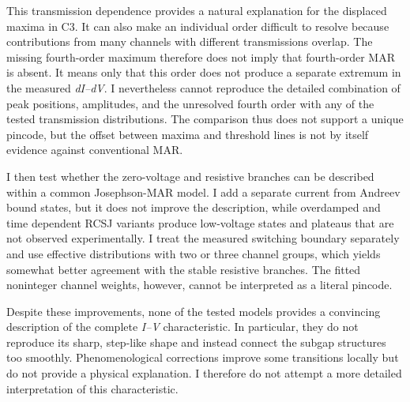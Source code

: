         This transmission dependence provides a natural explanation for the displaced maxima in C3. It can also make an individual order difficult to resolve because contributions from many channels with different transmissions overlap. The missing fourth-order maximum therefore does not imply that fourth-order MAR is absent. It means only that this order does not produce a separate extremum in the measured \textit{dI--dV}. I nevertheless cannot reproduce the detailed combination of peak positions, amplitudes, and the unresolved fourth order with any of the tested transmission distributions. The comparison thus does not support a unique pincode, but the offset between maxima and threshold lines is not by itself evidence against conventional MAR.


        I then test whether the zero-voltage and resistive branches can be described within a common Josephson-MAR model. I add a separate current from Andreev bound states, but it does not improve the description, while overdamped and time dependent RCSJ variants produce low-voltage states and plateaus that are not observed experimentally. I treat the measured switching boundary separately and use effective distributions with two or three channel groups, which yields somewhat better agreement with the stable resistive branches. The fitted noninteger channel weights, however, cannot be interpreted as a literal pincode.

        Despite these improvements, none of the tested models provides a convincing description of the complete \textit{I--V} characteristic. In particular, they do not reproduce its sharp, step-like shape and instead connect the subgap structures too smoothly. Phenomenological corrections improve some transitions locally but do not provide a physical explanation. I therefore do not attempt a more detailed interpretation of this characteristic.

